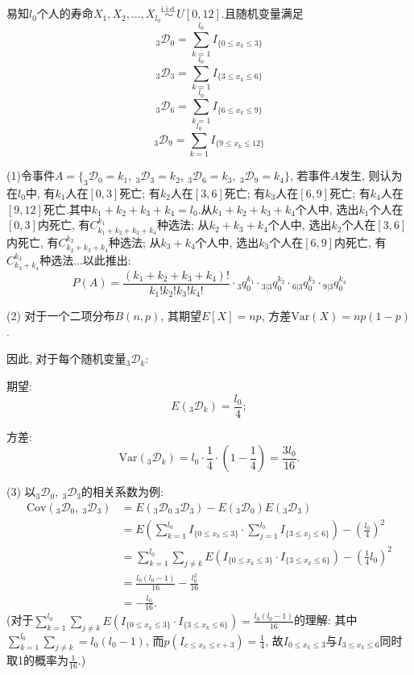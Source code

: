 \documentclass[a4paper,10pt]{ctexbook}
\begin{document}
\solution
易知$l_{0}$个人的寿命$X_{1},X_{2},...,X_{l_{0}}\stackrel{\text{i.i.d.}}{\sim}U[0,12]$.且随机变量满足
$$_{3}\mathscr D _{0}=\sum^{l_{0}}_{k=1}I_{\{0\leq x_k \leq 3\}}$$
$$_{3}\mathscr D _{3}=\sum^{l_{0}}_{k=1}I_{\{3\leq x_k \leq 6\}}$$
$$_{3}\mathscr D _{6}=\sum^{l_{0}}_{k=1}I_{\{6\leq x_k \leq 9\}}$$
$$_{3}\mathscr D _{9}=\sum^{l_{0}}_{k=1}I_{\{9\leq x_k \leq 12\}}$$

(1)令事件$A=\{_{3}\mathscr D _{0}=k_{1},\ _{3}\mathscr D _{3}=k_{2},\ _{3}\mathscr D _{6}=k_{3},\ _{3}\mathscr D _{9}=k_{4}\}$, 若事件$A$发生, 则认为在$l_{0}$中, 有$k_{1}$人在$[0,3]$死亡; 有$k_{2}$人在$[3,6]$死亡; 有$k_{3}$人在$[6,9]$死亡; 有$k_{4}$人在$[9,12]$死亡.其中$k_{1}+k_{2}+k_{3}+k_{4}=l_{0}.$从$k_{1}+k_{2}+k_{3}+k_{4}$个人中, 选出$k_{1}$个人在$[0,3]$内死亡, 有$C_{k_{1}+k_{2}+k_{3}+k_{4}}^{k_{1}}$种选法; 从$k_{2}+k_{3}+k_{4}$个人中, 选出$k_{2}$个人在$[3,6]$内死亡, 有$C_{k_{2}+k_{3}+k_{4}}^{k_{2}}$种选法; 从$k_{3}+k_{4}$个人中, 选出$k_{3}$个人在$[6,9]$内死亡, 有$C_{k_{3}+k_{4}}^{k_{3}}$种选法...以此推出:
$$
    P(A)=\frac{(k_{1}+k_{2}+k_{3}+k_{4})!}{k_{1}!k_{2}!k_{3}!k_{4}!}\cdot {}_{3}q_{0}^{k_{1}}\cdot {}_{3|3}q_{0}^{k_{2}}\cdot {}_{6|3}q_{0}^{k_{3}}\cdot {}_{9|3}q_{0}^{k_{4}}
$$

(2) 对于一个二项分布$B(n, p)$, 其期望$E[X] = np$, 方差$\text{Var}(X) = np(1-p)$.

因此, 对于每个随机变量$_{3}\mathscr D_{k}$:

期望: $$E(_{3}\mathscr D_{k}) = \frac{l_0}{4};$$

方差: $$\text{Var}(_{3}\mathscr D_{k}) = l_0 \cdot \frac{1}{4} \cdot \left(1 - \frac{1}{4}\right) = \frac{3l_0}{16}.$$

(3) 以$_{3}\mathscr D _{0},\ _{3}\mathscr D _{3}$的相关系数为例:
\begin{align*}
    \text{Cov}(_{3}\mathscr D _{0},\ _{3}\mathscr D _{3}) & =E(_{3}\mathscr D _{0}\ _{3}\mathscr D _{3})-E(_{3}\mathscr D _{0})E(_{3}\mathscr D _{3})                                \\
                                                          & =E(\sum ^{l_{0}}_{k=1}I_{\{0\leq x_{k}\leq 3\}}\cdot \sum ^{l_{0}}_{j=1}I_{\{3\leq x_{j}\leq 6\}})-(\frac{l_{0}}{4})^{2} \\
                                                          & =\sum^{l_{0}}_{k=1}\sum_{j\neq k}E(I_{\{0\leq x_{k}\leq 3\}}\cdot I_{\{3\leq x_{k}\leq 6\}})-(\frac{1}{4}l_{0})^{2}      \\
                                                          & =\frac{l_{0}(l_{0}-1)}{16}-\frac{l_{0}^{2}}{16}                                                                          \\
                                                          & =-\frac{l_{0}}{16}.
\end{align*}
(对于$\sum^{l_{0}}_{k=1}\sum_{j\neq k}E(I_{\{0\leq x_{k}\leq 3\}}\cdot I_{\{3\leq x_{k}\leq 6\}}) = \frac{l_{0}(l_{0}-1)}{16}$的理解: 其中$\sum^{l_{0}}_{k=1}\sum_{j\neq k} = l_0(l_0-1)$, 而$p(I_{c\leq x_{k}\leq c+3}) = \frac14$, 故$I_{0\leq x_{k}\leq 3}$与$I_{3\leq x_{k}\leq 6}$同时取1的概率为$\frac{1}{16}$.)
\end{document}
